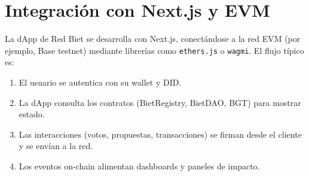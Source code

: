 \documentclass[12pt]{report}
\begin{document}
\section{Integración con Next.js y EVM}
La dApp de Red Biet se desarrolla con Next.js, conectándose a la red EVM (por ejemplo, Base testnet) mediante librerías como \texttt{ethers.js} o \texttt{wagmi}. 
El flujo típico es:
\begin{enumerate}
    \item El usuario se autentica con su wallet y DID.
    \item La dApp consulta los contratos (BietRegistry, BietDAO, BGT) para mostrar estado.
    \item Las interacciones (votos, propuestas, transacciones) se firman desde el cliente y se envían a la red.
    \item Los eventos on-chain alimentan dashboards y paneles de impacto.
\end{enumerate}
\end{document}
